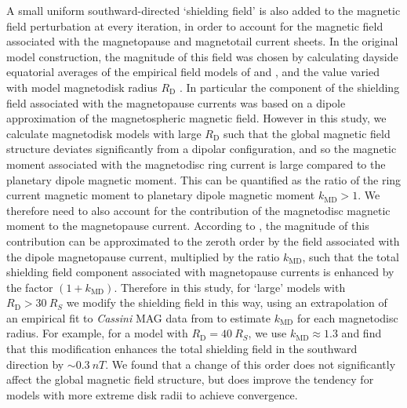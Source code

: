 A small uniform southward-directed `shielding field' is also added to the magnetic field perturbation at every iteration, in order to account for the magnetic field associated with the magnetopause and magnetotail current sheets. In the original model construction, the magnitude of this field was chosen by calculating dayside equatorial averages of the empirical field models of \citet{alexeev2005} and \citet{alexeev2006}, and the value varied with model magnetodisk radius $R_\mathrm{D}$ \citep[see][Figure 6]{achilleos2010a}. In particular the component of the shielding field associated with the magnetopause currents was based on a dipole approximation of the magnetospheric magnetic field. However in this study, we calculate magnetodisk models with large $R_\mathrm{D}$ such that the global magnetic field structure deviates significantly from a dipolar configuration, and so the magnetic moment associated with the magnetodisc ring current is large compared to the planetary dipole magnetic moment. This can be quantified as the ratio of the ring current magnetic moment to planetary dipole magnetic moment $k_\mathrm{MD} > 1$. We therefore need to also account for the contribution of the magnetodisc magnetic moment to the magnetopause current. According to \citet{alexeev2005}, the magnitude of this contribution can be approximated to the zeroth order by the field associated with the dipole magnetopause current, multiplied by the ratio $k_\mathrm{MD}$, such that the total shielding field component associated with magnetopause currents is enhanced by the factor $(1+k_\mathrm{MD})$. Therefore in this study, for `large' models with $R_\mathrm{D} > \SI{30}{R_S}$ we modify the shielding field in this way, using an extrapolation of an empirical fit to \textit{Cassini} MAG data from \citet{bunce2007} to estimate $k_\mathrm{MD}$ for each magnetodisc radius. For example, for a model with $R_\mathrm{D} = \SI{40}{R_S}$, we use $k_\mathrm{MD}{\approx}1.3$ and find that this modification enhances the total shielding field in the southward direction by ${\sim}\SI{0.3}{nT}$. We found that a change of this order does not significantly affect the global magnetic field structure, but does improve the tendency for models with more extreme disk radii to achieve convergence.

